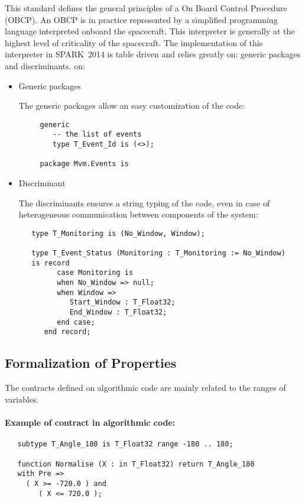 \documentclass[10pt,a4paper,twocolumn]{article}
\newcommand{\newspark}{SPARK~2014\xspace}
\begin{document}
This standard defines the general principles of a On Board Control Procedure (OBCP). An OBCP is in practice represented by a simplified programming language interpreted onboard the spacecraft. This interpreter is generally at the highest level of criticality of the spacecraft. The implementation of this interpreter in \newspark is table driven and relies greatly
\ifdefined\abstractonly
on: generic packages and discriminants.
\else
on:
\begin{itemize}
\item Generic packages

	The generic packages allow an easy customization of the code:

	\begin{verbatim}
     generic
        -- the list of events
        type T_Event_Id is (<>);

     package Mvm.Events is
	\end{verbatim}

\item Discriminant

	The discriminants ensures a string typing of the code, even in case of heterogeneous communication between components of the system:

	\begin{verbatim}
   type T_Monitoring is (No_Window, Window);

   type T_Event_Status (Monitoring : T_Monitoring := No_Window)
   is record
         case Monitoring is
         when No_Window => null;
         when Window =>
            Start_Window : T_Float32;
            End_Window : T_Float32;
         end case;
      end record;
	\end{verbatim}
\end{itemize}
\fi

\subsection{Formalization of Properties}

The contracts defined on algorithmic code are mainly related to the ranges of variables.

\ifdefined\abstractonly
\else
\paragraph{Example of contract in algorithmic code:}

\begin{verbatim}
   subtype T_Angle_180 is T_Float32 range -180 .. 180;

   function Normalise (X : in T_Float32) return T_Angle_180
   with Pre =>
     ( X >= -720.0 ) and
        ( X <= 720.0 );
\end{verbatim}
\fi
\end{document}
